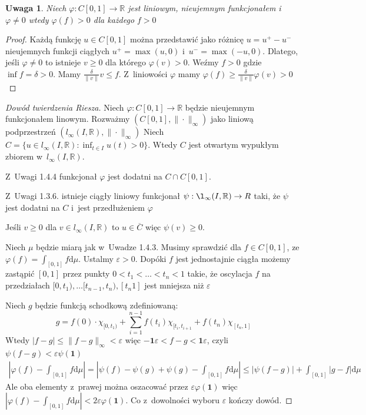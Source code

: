 \documentclass[11pt]{mwrep}
\renewcommand{\[}{\begin{equation}}
\renewcommand{\]}{\end{equation}}
\newcommand{\R}{{\ensuremath{\mathbb R}}}
\newcommand{\dd}{\mathrm{d}}
\newcommand{\norm}{\|\cdot\|}
\newtheorem{uwaga}[subsection]{Uwaga}
\begin{document}
\begin{uwaga}
	Niech $\varphi:C[0,1] \to \R$ jest liniowym, nieujemnym funkcjonałem i~$\varphi \not = 0$ wtedy  $\varphi(f) >0 $ dla każdego $f>0$ 
\end{uwaga}
\begin{proof}
	Każdą funkcję $u \in C[0,1]$ można przedstawić jako różnicę $u=u^+-u^-$ nieujemnych funkcji ciągłych $u^+ = \max(u,0)$ i~$u^- = \max(-u,0)$.
	Dlatego, jeśli $\varphi\not = 0$ to istnieje $v\ge 0$ dla którego $\varphi(v)>0$.
	Weźmy $f>0$ gdzie $\inf f = \delta >0$. Mamy $\frac{\delta}{\|v\|}v\le f$. Z~liniowości $\varphi$ mamy $\varphi(f)\ge \frac{\delta}{\|v\|}\varphi(v)>0$
\end{proof}
\begin{proof}[Dowód twierdzenia Riesza]
	Niech $\varphi: C[0,1] \to \R$ będzie  nieujemnym funkcjonałem linowym.
	Rozważmy $\left( C[0,1],\norm_\infty \right)$ jako liniową podprzestrzeń $\left( l_\infty (I,\R),\norm_\infty \right)$
	Niech $C=\{ u\in l_\infty (I,\R): \inf_{t \in I} u(t) >0\}$. Wtedy $C$ jest otwartym wypukłym zbiorem w~$l_\infty(I,\R)$. \par
	Z~Uwagi 1.4.4 funkcjonał $\varphi$ jest dodatni na $C \cap C[0,1]$.\par
	Z~Uwagi 1.3.6.	istnieje ciągły liniowy funkcjonał $\psi:\l_\infty(I,\R) \to R$ taki, że $\psi$ jest dodatni na $C$ i~jest przedłużeniem $\varphi$\par
	Jeśli $v\ge 0$ dla $v \in l_\infty (I,\R)$ to $u\in \overline{C}$ więc $\psi(v)\ge0$.\par
	Niech $\mu$ będzie miarą jak w~Uwadze 1.4.3.
	Musimy sprawdzić dla $f\in C[0,1]$, ze $\varphi(f) = \int_{[0,1]}f \dd \mu$.
	Ustalmy $\varepsilon>0$. Dopóki $f$ jest jednostajnie ciągła możemy zastąpić $[0,1]$ przez punkty $0<t_1<\ldots<t_n<1$
	takie, że oscylacja $f$ na przedziałach $[0,t_1),\ldots [t_{n-1},t_{n}), [t_n 1]$ jest mniejsza niż $\varepsilon$\par
	Niech $g$  będzie funkcją schodkową zdefiniowaną: 
	$$g= f(0)\cdot \chi_{[0,t_1)} + \sum_{i=1}^{n-1}f(t_i) \chi_{[t_i,t_{i+1}} + f(t_n) \chi_{[t_n,1]}$$
	Wtedy $|f-g| \le \|f-g\|_\infty<\varepsilon$ więc $-\mathbf{1} \varepsilon < f-g < \mathbf{1} \varepsilon$, 
	czyli $\psi(f-g) <\varepsilon \psi(\mathbf{1})$
 	\begin{multline}
	\left|\varphi(f) - \int_{[0,1]} f \dd \mu\right| = \left| \psi(f) - \psi(g) +\psi(g) - \int_{[0,1]} f \dd \mu \right|
	\le \left| \psi(f-g)\right| + \int_{[0,1]} \left| g - f \right| \dd\mu
	\nonumber
  \end{multline}
  Ale oba elementy z~prawej można oszacować przez $\varepsilon\varphi(\mathbf{1})$ więc $\left|\varphi(f) - \int_{[0,1]} f \dd \mu\right|<2\varepsilon\varphi(\mathbf{1})$.
  Co z~dowolności wyboru $\varepsilon$ kończy dowód.
\end{proof}
\end{document}
